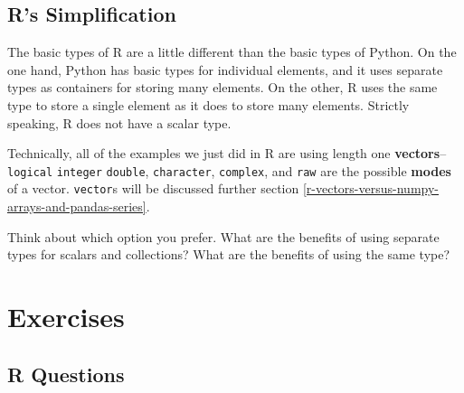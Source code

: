 \documentclass[12pt,krantz2]{krantz}
\begin{document}
\hypertarget{rs-simplification}{%
\subsection{R's Simplification}\label{rs-simplification}}

The basic types of R are a little different than the basic types of Python. On the one hand, Python has basic types for individual elements, and it uses separate types as containers for storing many elements. On the other, R uses the same type to store a single element as it does to store many elements. Strictly speaking, R does not have a scalar type.

Technically, all of the examples we just did in R are using length one \textbf{vectors}--\texttt{logical} \texttt{integer} \texttt{double}, \texttt{character}, \texttt{complex}, and \texttt{raw} are the possible \textbf{modes} of a vector. \texttt{vector}s will be discussed further section \ref{r-vectors-versus-numpy-arrays-and-pandas-series}.

Think about which option you prefer. What are the benefits of using separate types for scalars and collections? What are the benefits of using the same type?

\hypertarget{exercises}{%
\section{Exercises}\label{exercises}}

\hypertarget{r-questions}{%
\subsection{R Questions}\label{r-questions}}
\end{document}
